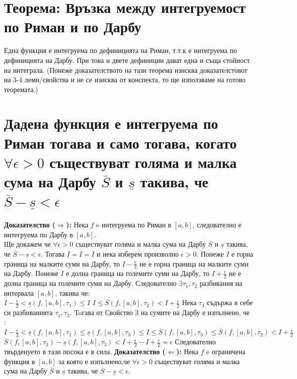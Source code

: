 \documentclass[fleqn,12pt]{article}
\begin{document}
\begin{flushleft}
\section{Теорема: Връзка между интегруемост по Риман и по Дарбу}
Една функция е интегруема по дефиницията на Риман, т.т.к е интегруема по дефиницията на Дарбу. При това и двете дефиниции дават една и съща стойност на интеграла.
(Понеже доказателството на тази теорема изисква доказателстовот на 3-4 леми/свойства и не се изисква от конспекта, то ще използваме на готово теоремата.)

\section{Дадена функция е интегруема по Риман тогава и само тогава, когато $\forall\epsilon > 0$ съществуват голяма и малка сума на Дарбу $\overline{S}$ и $\underline{s}$ такива, че $\overline{S}-\underline{s} < \epsilon$}
\textbf{Доказателство ($\Longrightarrow$):} Нека $f$ e интегруема по Риман в $[a,b]$, следователно е интегруема по Дарбу в $[a,b]$. \\
Ще докажем че $\forall\epsilon > 0$ съществуват голяма и малка сума на Дарбу $\overline{S}$ и $\underline{s}$ такива, че $\overline{S} - \underline{s} < \epsilon$.
Тогава $\underline{I}=\overline{I}=I$ и нека изберем произволно $\epsilon > 0$. Понеже $I$ е горна граница на малките суми на Дарбу, то 
$I - \frac{\epsilon}{2}$ не е горна граница на малките суми на Дарбу. Понеже $I$ е долна граница на големите суми на Дарбу, то $I + \frac{\epsilon}{2}$ не е долна граница на големите суми на Дарбу.
Следователно $\exists \tau_1,\tau_2$ разбивания на интервала $[a,b]$, такива че: \\
$I - \frac{\epsilon}{2} < \underline{s}(f,[a,b],\tau_1) \leq I$
$I \leq \overline{S}(f,[a,b],\tau_2) < I + \frac{\epsilon}{2}$
Нека $\tau_3$ съдържа в себе си разбиванията $\tau_1,\tau_2$. Toгава от Свойство 3 на сумите на Дарбу е изпълнено, че :\\
$I - \frac{\epsilon}{2} < \underline{s}(f,[a,b],\tau_1) \leq  \underline{s}(f,[a,b],\tau_3) \leq I \leq \overline{S}(f,[a,b],\tau_3) \leq \overline{S}(f,[a,b],\tau_2) < I + \frac{\epsilon}{2}$
$\overline{S}(f,[a,b],\tau_3) - \underline{s}(f,[a,b],\tau_3) < I + \frac{\epsilon}{2} - I + \frac{\epsilon}{2} = \epsilon$
Следователно твърденуето в тази посока е в сила.
\textbf{Доказателство ($\Longleftarrow$):}
Нека $f$ e ограничена функция в $[a,b]$ за която е изпълнено,че $\forall\epsilon > 0$ съществуват голяма и малка сума на Дарбу $\overline{S}$ и $\underline{s}$ такива, че $\overline{S} - \underline{s} < \epsilon$.

\end{flushleft}
\end{document}
